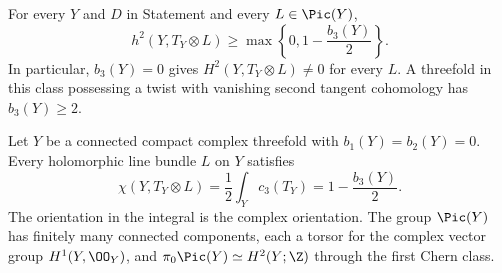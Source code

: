 
\begin{proposition}\hypertarget{tag-01BP}{}\label{cdp:st:C.1.3}


For every $Y$ and $D$ in Statement  and every $L\in\Pic(Y)$,
\[
 h^2(Y,T_Y\otimes L)\geq
 \max\left\{0,1-\frac{b_3(Y)}2\right\}.
\]
In particular, $b_3(Y)=0$ gives $H^2(Y,T_Y\otimes L)\ne0$ for
every $L$. A threefold in this class possessing a twist with vanishing
second tangent cohomology has $b_3(Y)\geq2$.
\end{proposition}

\begin{proposition}\hypertarget{tag-01BN}{}\label{cdp:st:C.1.1}


Let $Y$ be a connected compact complex threefold with
$b_1(Y)=b_2(Y)=0$. Every holomorphic line bundle $L$ on $Y$ satisfies
\[
 \chi(Y,T_Y\otimes L)=\frac12\int_Yc_3(T_Y)
 =1-\frac{b_3(Y)}2.
\]
The orientation in the integral is the complex orientation. The group
$\Pic(Y)$ has finitely many connected components, each a torsor for the
complex vector group $H^1(Y,\OO_Y)$, and
$\pi_0\Pic(Y)\simeq H^2(Y;\Z)$ through the first Chern class.
\end{proposition}

